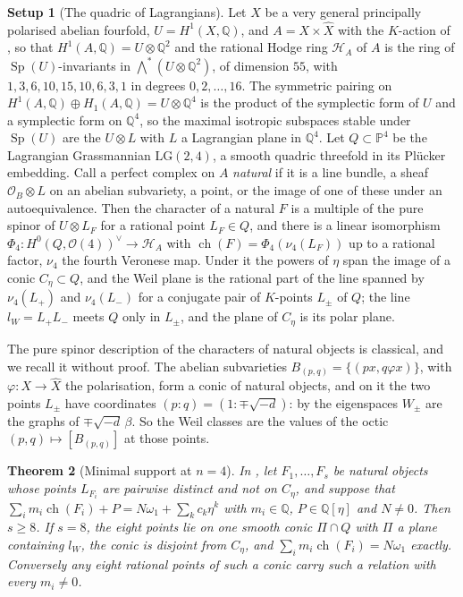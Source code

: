 \documentclass[11pt,reqno]{amsart}
\theoremstyle{plain}
\newtheorem{theorem}{Theorem}[section]
\theoremstyle{definition}
\newtheorem{setupenv}[theorem]{Setup}
\theoremstyle{remark}
\newcommand{\QQ}{\mathbb{Q}}
\newcommand{\PP}{\mathbb{P}}
\newcommand{\cO}{\mathcal{O}}
\DeclareMathOperator{\ch}{ch}
\DeclareMathOperator{\Sp}{Sp}
\begin{document}
\begin{setupenv}[The quadric of Lagrangians]\label{setup:lagquadric}
Let $X$ be a very general principally polarised abelian fourfold,
$U=H^{1}(X,\QQ)$, and $A=X\times\widehat{X}$ with the $K$-action of
\cite[(29)]{paperI}, so that $H^{1}(A,\QQ)=U\otimes\QQ^{2}$ and the rational Hodge
ring $\mathcal{H}_{A}$ of $A$ is the ring of $\Sp(U)$-invariants in
$\bigwedge^{*}(U\otimes\QQ^{2})$, of dimension $55$, with
$1,3,6,10,15,10,6,3,1$ in degrees $0,2,\dots,16$. The symmetric pairing on
$H^{1}(A,\QQ)\oplus H_{1}(A,\QQ)=U\otimes\QQ^{4}$ is the product of the
symplectic form of $U$ and a symplectic form on $\QQ^{4}$, so the maximal
isotropic subspaces stable under $\Sp(U)$ are the $U\otimes L$ with $L$ a
Lagrangian plane in $\QQ^{4}$. Let $Q\subset\PP^{4}$ be the Lagrangian
Grassmannian $\mathrm{LG}(2,4)$, a smooth quadric threefold in its
Pl\"ucker embedding. Call a perfect complex on $A$ \emph{natural} if it is a line
bundle, a sheaf $\cO_{B}\otimes L$ on an abelian subvariety, a point, or the
image of one of these under an autoequivalence. Then the character of a natural
$F$ is a multiple of the pure spinor of $U\otimes L_{F}$ for a rational point
$L_{F}\in Q$, and there is a linear isomorphism
$\Phi_{4}\colon H^{0}(Q,\cO(4))^{\vee}\to\mathcal{H}_{A}$ with
$\ch(F)=\Phi_{4}(\nu_{4}(L_{F}))$ up to a rational factor, $\nu_{4}$ the
fourth Veronese map. Under it the powers of $\eta$ span the image of a conic
$C_{\eta}\subset Q$, and the Weil plane is the rational part of the line
spanned by $\nu_{4}(L_{+})$ and $\nu_{4}(L_{-})$ for a conjugate pair of
$K$-points $L_{\pm}$ of $Q$; the line $l_{W}=L_{+}L_{-}$ meets $Q$ only in
$L_{\pm}$, and the plane of $C_{\eta}$ is its polar plane.
\end{setupenv}

The pure spinor description of the characters of natural objects is
classical, and we recall it without proof. The abelian subvarieties
$B_{(p,q)}=\{(px,q\varphi x)\}$, with $\varphi\colon X\to\widehat{X}$ the
polarisation, form a conic of natural objects, and on it the two points $L_{\pm}$
have coordinates $(p:q)=(1:\mp\sqrt{-d})$: by \cite[Theorem~14.2(iv)]{paperI} the
eigenspaces $W_{\pm}$ are the graphs of $\mp\sqrt{-d}\,\beta$. So the Weil
classes are the values of the octic $(p,q)\mapsto[B_{(p,q)}]$ at those points.

\begin{theorem}[Minimal support at $n=4$]\label{thm:minimalsupport}
In , let $F_{1},\dots,F_{s}$ be natural objects whose
points $L_{F_{i}}$ are pairwise distinct and not on $C_{\eta}$, and suppose
that $\sum_{i}m_{i}\ch(F_{i})+P=N\omega_{1}+\sum_{k}c_{k}\eta^{k}$ with
$m_{i}\in\QQ$, $P\in\QQ[\eta]$ and $N\ne0$. Then $s\ge8$. If $s=8$, the eight
points lie on one smooth conic $\Pi\cap Q$ with $\Pi$ a plane containing
$l_{W}$, the conic is disjoint from $C_{\eta}$, and
$\sum_{i}m_{i}\ch(F_{i})=N\omega_{1}$ exactly. Conversely any eight rational
points of such a conic carry such a relation with every $m_{i}\ne0$.
\end{theorem}
\end{document}
